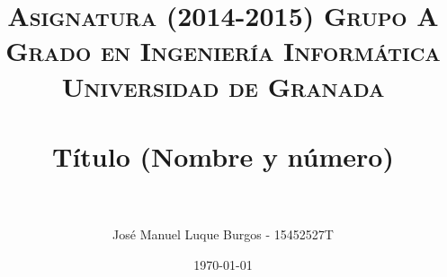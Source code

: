 
\usepackage{url}
\usepackage[linktocpage]{hyperref}
\usepackage{xcolor}
\usepackage{listings}

\title{	
\normalfont \normalsize 
\textsc{{\bf Asignatura (2014-2015) Grupo A} \\ Grado en Ingeniería Informática \\ Universidad de Granada} \\ [25pt] %
\horrule{0.5pt} \\[0.4cm] %
\huge Título (Nombre y número) \\ %
\horrule{2pt} \\[0.5cm] %
}
\author{José Manuel Luque Burgos - 15452527T} %

\date{\normalsize\today} %







\maketitle %

